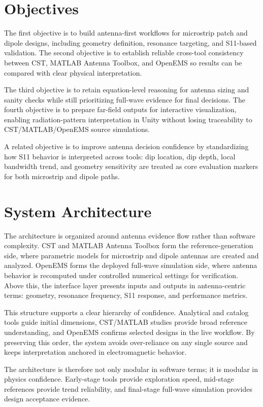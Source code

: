 \documentclass[12pt,a4paper]{article}
\begin{document}
\section{Objectives}
The first objective is to build antenna-first workflows for microstrip patch and dipole designs, including geometry definition, resonance targeting, and S11-based validation. The second objective is to establish reliable cross-tool consistency between CST, MATLAB Antenna Toolbox, and OpenEMS so results can be compared with clear physical interpretation.

The third objective is to retain equation-level reasoning for antenna sizing and sanity checks while still prioritizing full-wave evidence for final decisions. The fourth objective is to prepare far-field outputs for interactive visualization, enabling radiation-pattern interpretation in Unity without losing traceability to CST/MATLAB/OpenEMS source simulations.

A related objective is to improve antenna decision confidence by standardizing how S11 behavior is interpreted across tools: dip location, dip depth, local bandwidth trend, and geometry sensitivity are treated as core evaluation markers for both microstrip and dipole paths.

\section{System Architecture}
The architecture is organized around antenna evidence flow rather than software complexity. CST and MATLAB Antenna Toolbox form the reference-generation side, where parametric models for microstrip and dipole antennas are created and analyzed. OpenEMS forms the deployed full-wave simulation side, where antenna behavior is recomputed under controlled numerical settings for verification. Above this, the interface layer presents inputs and outputs in antenna-centric terms: geometry, resonance frequency, S11 response, and performance metrics.

This structure supports a clear hierarchy of confidence. Analytical and catalog tools guide initial dimensions, CST/MATLAB studies provide broad reference understanding, and OpenEMS confirms selected designs in the live workflow. By preserving this order, the system avoids over-reliance on any single source and keeps interpretation anchored in electromagnetic behavior.

The architecture is therefore not only modular in software terms; it is modular in physics confidence. Early-stage tools provide exploration speed, mid-stage references provide trend reliability, and final-stage full-wave simulation provides design acceptance evidence.
\end{document}
